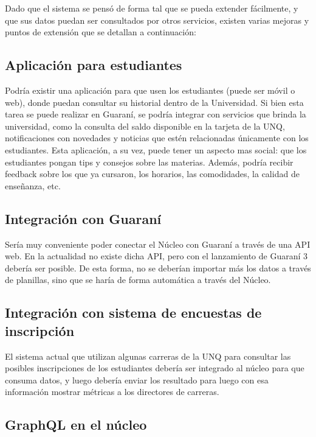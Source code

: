 Dado que el sistema se pensó de forma tal que se pueda extender fácilmente, y que sus datos puedan ser consultados por otros servicios, existen varias mejoras y puntos de extensión que se detallan a continuación:

\subsection[Aplicación para estudiantes]{Aplicación para estudiantes}

Podría existir una aplicación para que usen los estudiantes (puede ser móvil o web), donde puedan consultar su historial dentro de la Universidad. Si bien esta tarea se puede realizar en Guaraní, se podría integrar con servicios que brinda la universidad, como la consulta del saldo disponible en la tarjeta de la UNQ, notificaciones con novedades y noticias que estén relacionadas únicamente con los estudiantes.
Esta aplicación, a su vez, puede tener un aspecto mas social: que los estudiantes pongan tips y consejos sobre las materias.
Además, podría recibir feedback sobre los que ya cursaron, los horarios, las comodidades, la calidad de enseñanza, etc.

\subsection[Integración con Guaraní]{Integración con Guaraní}

Sería muy conveniente poder conectar el Núcleo con Guaraní a través de una API web. En la actualidad no existe dicha API, pero con el lanzamiento de Guaraní 3 debería ser posible. De esta forma, no se deberían importar más los datos a través de planillas, sino que se haría de forma automática a través del Núcleo.

\subsection[Integración con sistema de encuestas de inscripción]{Integración con sistema de encuestas de inscripción}

El sistema actual que utilizan algunas carreras de la UNQ para consultar las posibles inscripciones de los estudiantes debería ser integrado al núcleo para que consuma datos, y luego debería enviar los resultado para luego con esa información mostrar métricas a los directores de carreras. 


\subsection[GraphQL en el núcleo]{GraphQL en el núcleo}

